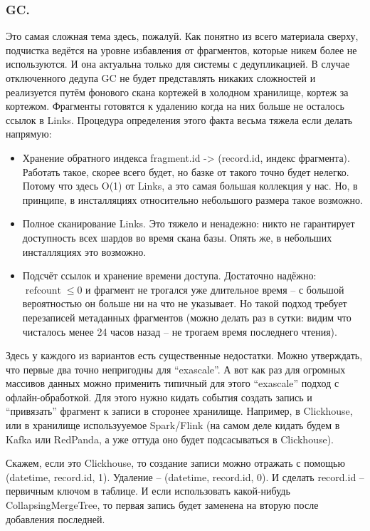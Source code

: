 \documentclass[a4paper,12pt]{article}
\begin{document}
    \subsubsection{GC.}
    Это самая сложная тема здесь, пожалуй. Как понятно из всего материала сверху, подчистка ведётся на уровне избавления от фрагментов, которые никем более не используются.
    И она актуальна только для системы с дедупликацией. В случае отключенного дедупа GC не будет представлять никаких сложностей и реализуется путём фонового
    скана кортежей в холодном хранилище, кортеж за кортежом.
    \smallskip
    Фрагменты готовятся к удалению когда на них больше не осталось ссылок в Links. Процедура определения этого факта весьма тяжела если делать напрямую:
    \begin{itemize}
        \item Хранение обратного индекса fragment.id -> (record.id, индекс фрагмента). Работать такое, скорее всего будет, но базке от такого точно будет нелегко.
        Потому что здесь O(1) от Links, а это самая большая коллекция у нас. Но, в принципе, в инсталляциях относительно небольшого размера такое возможно.
        \item Полное сканирование Links. Это тяжело и ненадежно: никто не гарантирует доступность всех шардов во время скана базы. Опять же, в небольших инсталляциях это возможно.
        \item Подсчёт ссылок и хранение времени доступа. Достаточно надёжно: $\operatorname{refcount} \leqslant 0$ и фрагмент не трогался уже длительное время – с большой вероятностью он больше ни на что не указывает.
        Но такой подход требует перезаписей метаданных фрагментов (можно делать раз в сутки: видим что чисталось менее 24 часов назад – не трогаем время последнего чтения).
    \end{itemize}

    Здесь у каждого из вариантов есть существенные недостатки. Можно утверждать, что первые два точно непригодны для \enquote{exascale}. А вот как раз для огромных массивов данных
    можно применить типичный для этого \enquote{exascale} подход с офлайн-обработкой. Для этого нужно кидать события создать запись и \enquote{привязать} фрагмент к записи в сторонее хранилище.
    Например, в Clickhouse, или в хранилище использууемое Spark/Flink (на самом деле кидать будем в Kafka или RedPanda, а уже оттуда оно будет подсасываться в Clickhouse).

    \smallskip
    Скажем, если это Clickhouse, то создание записи можно отражать с помощью (datetime, record.id, 1). Удаление – (datetime, record.id, 0). И сделать record.id – первичным ключом в таблице.
    И если использовать какой-нибудь CollapsingMergeTree, то первая запись будет заменена на вторую после добавления последней.
\end{document}
